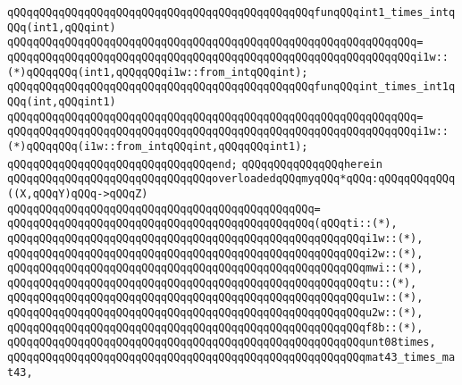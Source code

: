 \newline
\verb|qQQqqQQqqQQqqQQqqQQqqQQqqQQqqQQqqQQqqQQqqQQqqQQqfunqQQqint1_times_intqQQq(int1,qQQqint)|\newline
\verb|qQQqqQQqqQQqqQQqqQQqqQQqqQQqqQQqqQQqqQQqqQQqqQQqqQQqqQQqqQQqqQQq=|\newline
\verb|qQQqqQQqqQQqqQQqqQQqqQQqqQQqqQQqqQQqqQQqqQQqqQQqqQQqqQQqqQQqqQQqi1w::(*)qQQqqQQq(int1,qQQqqQQqi1w::from_intqQQqint);|\newline
\newline
\verb|qQQqqQQqqQQqqQQqqQQqqQQqqQQqqQQqqQQqqQQqqQQqqQQqfunqQQqint_times_int1qQQq(int,qQQqint1)|\newline
\verb|qQQqqQQqqQQqqQQqqQQqqQQqqQQqqQQqqQQqqQQqqQQqqQQqqQQqqQQqqQQqqQQq=|\newline
\verb|qQQqqQQqqQQqqQQqqQQqqQQqqQQqqQQqqQQqqQQqqQQqqQQqqQQqqQQqqQQqqQQqi1w::(*)qQQqqQQq(i1w::from_intqQQqint,qQQqqQQqint1);|\newline
\verb|qQQqqQQqqQQqqQQqqQQqqQQqqQQqqQQqend;|\newline
\verb|qQQqqQQqqQQqqQQqherein|\newline
\verb|qQQqqQQqqQQqqQQqqQQqqQQqqQQqqQQqoverloadedqQQqmyqQQq*qQQq:qQQqqQQqqQQq((X,qQQqY)qQQq->qQQqZ)|\newline
\verb|qQQqqQQqqQQqqQQqqQQqqQQqqQQqqQQqqQQqqQQqqQQqqQQq=|\newline
\verb|qQQqqQQqqQQqqQQqqQQqqQQqqQQqqQQqqQQqqQQqqQQqqQQq(qQQqti::(*),|\newline
\verb|qQQqqQQqqQQqqQQqqQQqqQQqqQQqqQQqqQQqqQQqqQQqqQQqqQQqqQQqi1w::(*),|\newline
\verb|qQQqqQQqqQQqqQQqqQQqqQQqqQQqqQQqqQQqqQQqqQQqqQQqqQQqqQQqi2w::(*),|\newline
\verb|qQQqqQQqqQQqqQQqqQQqqQQqqQQqqQQqqQQqqQQqqQQqqQQqqQQqqQQqmwi::(*),|\newline
\verb|qQQqqQQqqQQqqQQqqQQqqQQqqQQqqQQqqQQqqQQqqQQqqQQqqQQqqQQqtu::(*),|\newline
\verb|qQQqqQQqqQQqqQQqqQQqqQQqqQQqqQQqqQQqqQQqqQQqqQQqqQQqqQQqu1w::(*),|\newline
\verb|qQQqqQQqqQQqqQQqqQQqqQQqqQQqqQQqqQQqqQQqqQQqqQQqqQQqqQQqu2w::(*),|\newline
\verb|qQQqqQQqqQQqqQQqqQQqqQQqqQQqqQQqqQQqqQQqqQQqqQQqqQQqqQQqf8b::(*),|\newline
\verb|qQQqqQQqqQQqqQQqqQQqqQQqqQQqqQQqqQQqqQQqqQQqqQQqqQQqqQQqunt08times,|\newline
\verb|qQQqqQQqqQQqqQQqqQQqqQQqqQQqqQQqqQQqqQQqqQQqqQQqqQQqqQQqmat43_times_mat43,|\newline
